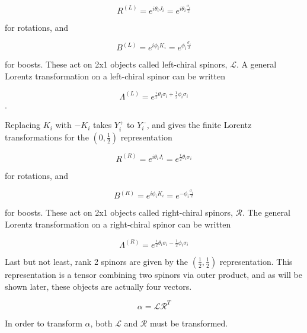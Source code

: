 \begin{equation}
R^{(L)} = e^{i\theta_i J_i} = e^{i\theta_i \frac{\sigma_i}{2}}   
\end{equation}

for rotations, and

\begin{equation}
B^{(L)} = e^{i\phi_i K_i} = e^{\phi_i \frac{\sigma_i}{2}}   
\end{equation}

for boosts. These act on 2x1 objects called left-chiral spinors, $\mathcal{L}$. A general Lorentz transformation on a left-chiral spinor can be written

\begin{equation}
\Lambda^{(L)} = e^{\frac{i}{2}\theta_i \sigma_i + \frac{1}{2}\phi_i \sigma_i}
\end{equation}.

Replacing $K_i$ with $-K_i$ takes $Y^+_i$ to $Y^-_i$, and gives the finite Lorentz transformations for the $(0, \frac{1}{2})$ representation 

\begin{equation}
R^{(R)} = e^{i\theta_i J_i} = e^{\frac{i}{2}\theta_i \sigma_i}   
\end{equation}

for rotations, and

\begin{equation}
B^{(R)} = e^{i\phi_i K_i} = e^{-\phi_i \frac{\sigma_i}{2}}   
\end{equation}

for boosts. These act on 2x1 objects called right-chiral spinors, $\mathcal{R}$. The general Lorentz transformation on a right-chiral spinor can be written

\begin{equation}
\Lambda^{(R)} = e^{\frac{i}{2}\theta_i \sigma_i - \frac{1}{2}\phi_i \sigma_i}
\end{equation}

Last but not least, rank 2 spinors are given by the $(\frac{1}{2}, \frac{1}{2})$ representation. This representation is a tensor combining two spinors via outer product, and as will be shown later, these objects are actually four vectors.

\begin{equation}
\alpha = \mathcal{L} \mathcal{R}^{T}
\end{equation}

In order to transform $\alpha$, both $\mathcal{L}$ and $\mathcal{R}$ must be transformed.

